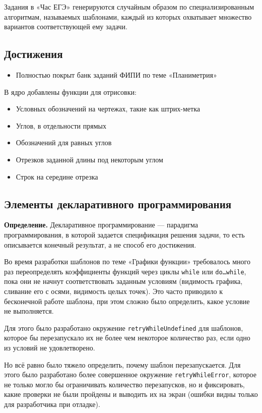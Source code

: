 \documentclass[a4paper, 12pt]{extarticle}
\begin{document}
Задания в «Час ЕГЭ» генерируются случайным образом по специализированным алгоритмам, называемых шаблонами, каждый из которых охватывает множество вариантов соответствующей ему задачи.

\subsection*{Достижения}
\begin{itemize}
	\item Полностью покрыт банк заданий ФИПИ по теме «Планиметрия»
\end{itemize}
В ядро добавлены функции для отрисовки:
\begin{itemize}
	\item Условных обозначений на чертежах, такие как штрих-метка
	\item Углов, в отдельности прямых
	\item Обозначений для равных углов
	\item Отрезков заданной длины под некоторым углом
	\item Строк на середине отрезка
\end{itemize}

\subsection*{Элементы декларативного программирования}

\textbf{Определение.} Декларативное программирование — парадигма программирования, в которой задается спецификация решения задачи, то есть описывается конечный результат, а не способ его достижения.~\cite{posobie}

Во время разработки шаблонов по теме «Графики функции» требовалось много раз переопределять коэффициенты функций через циклы 
\texttt{while} или \texttt{do\dots while}, пока они не начнут соответствовать заданным условиям (видимость графика, сливание его с осями, видимость целых точек). Это часто приводило к бесконечной работе шаблона, при этом сложно было определить, какое условие не выполняется.

Для этого было разработано окружение \texttt{retryWhileUndefined} для шаблонов, которое бы перезапускало их не более чем некоторое количество раз, если одно из условий не удовлетворено. 

Но всё равно было тяжело определить, почему шаблон перезапускается. Для этого было разработано более совершенное окружение \texttt{retryWhileError}, которое не только могло бы ограничивать количество перезапусков, но и фиксировать, какие проверки не были пройдены и выводить их на экран (ошибки видны только для разработчика при отладке).
\end{document}
